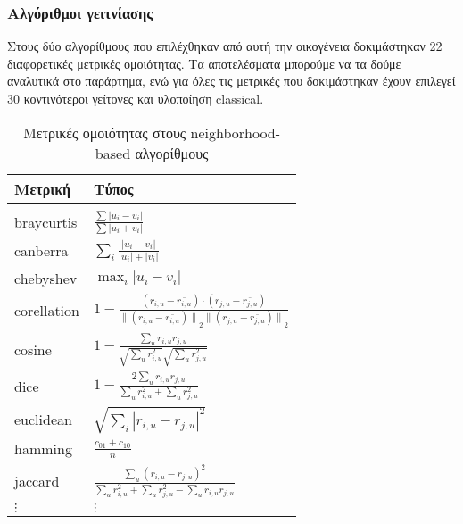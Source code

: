\subsubsection{Αλγόριθμοι γειτνίασης}
\noindent Στους δύο αλγορίθμους που επιλέχθηκαν από αυτή την οικογένεια δοκιμάστηκαν 22 διαφορετικές μετρικές ομοιότητας. Τα αποτελέσματα μπορούμε να τα δούμε αναλυτικά στο παράρτημα, ενώ για όλες τις μετρικές που δοκιμάστηκαν έχουν επιλεγεί 30 κοντινότεροι γείτονες και υλοποίηση classical.

\begin{table}[H]
\caption {Μετρικές ομοιότητας στους neighborhood-based αλγορίθμους} \label{tab:sim} 	
\begin{minipage}{0.5\textwidth}	
	
	
	\begin{tabular}{| l | l |} \hline {\textbf{Μετρική}} & {\textbf{Τύπος}} \\  \hline 
 & \\		
braycurtis & \(\displaystyle  \frac{\sum{|u_i-v_i|}}{\sum{|u_i+v_i|}} \) \\[6mm] 
canberra & $ \sum_i \frac{|u_i-v_i|}{|u_i|+|v_i|} $\\[6mm]  
chebyshev & $ \max_i {|u_i-v_i|} $\\[6mm] 
corellation & \(\displaystyle 
 	1 - \frac{\left( r_{i,u} - \overline{ r_{i,u}}\right) \cdot{\left( r_{j,u} - \overline{ r_{j,u}} \right) }  }{{\| \left( r_{i,u} - \overline{ r_{i,u}}\right)\|} _{2}{\| \left( r_{j,u} - \overline{ r_{j,u}}\right)\|} _{2}}  \) \\[6mm] 
cosine & \(\displaystyle  1 - \frac{\sum_{u}r_{i,u}r_{j,u}}{\sqrt{\sum_{u}r_{i,u}^2} \sqrt{\sum_{u}r_{j,u}^2}} \)    \\[10mm] 
dice & \(\displaystyle  1 - \frac{2\sum_{u}r_{i,u}r_{j,u}}{\sum_{u}r_{i,u}^2 + \sum_{u}r_{j,u}^2} \) \\ [6mm] 
 euclidean & $  \sqrt{\sum_i {\left| r_{i,u} - r_{j,u} \right|^2}} $  \\[6mm]  
 hamming &  \(\displaystyle  \frac{c_{01} + c_{10}}{n}  \)   \\[6mm]  
  jaccard & \(\displaystyle   \frac{\sum_{u}\left( r_{i,u}-r_{j,u}\right)^2 }{\sum_{u}r_{i,u}^2 + \sum_{u}r_{j,u}^2-\sum_{u}r_{i,u}r_{j,u}} \)  \\[6mm] 
  $ \vdots $ &$  \vdots $  \\ \hline
\end{tabular}

\end{minipage}
\end{table}
